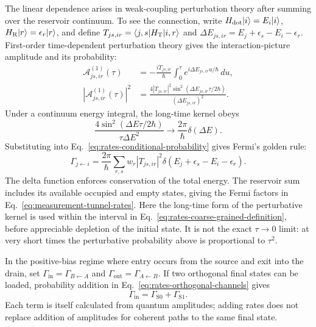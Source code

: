 The linear dependence arises in weak-coupling perturbation theory
after summing over the reservoir continuum. To see the connection,
write $H_{\mathrm{dot}}\lvert i\rangle=E_i\lvert i\rangle$,
$H_{\mathrm R}\lvert r\rangle=\epsilon_r\lvert r\rangle$, and define
$T_{js,ir}=\langle j,s\rvert H_{\mathrm T}\lvert i,r\rangle$ and
$\Delta E_{js,ir}=E_j+\epsilon_s-E_i-\epsilon_r$.
First-order time-dependent perturbation theory gives the
interaction-picture amplitude and its probability:
\begin{equation}
 \begin{aligned}
 \mathcal A^{(1)}_{js,ir}(\tau)
   &=-\frac{iT_{js,ir}}{\hbar}
       \int_0^\tau e^{i\Delta E_{js,ir}u/\hbar}\,du,\\
 |\mathcal A^{(1)}_{js,ir}(\tau)|^2
   &=\frac{4|T_{js,ir}|^2
       \sin^2(\Delta E_{js,ir}\tau/2\hbar)}{(\Delta E_{js,ir})^2}.
 \end{aligned}
 \label{eq:rates-perturbative-amplitude}
\end{equation}
Under a continuum energy integral, the long-time kernel obeys
\[
 \frac{4\sin^2(\Delta E\tau/2\hbar)}{\tau\Delta E^2}
     \longrightarrow\frac{2\pi}{\hbar}\delta(\Delta E).
\]
Substituting into
Eq.~\eqref{eq:rates-conditional-probability} gives Fermi's golden rule:
\begin{equation}
 \Gamma_{j\leftarrow i}
 =\frac{2\pi}{\hbar}\sum_{r,s}w_r|T_{js,ir}|^2
       \delta(E_j+\epsilon_s-E_i-\epsilon_r).
 \label{eq:rates-golden-rule}
\end{equation}
The delta function enforces conservation of the total energy.
The reservoir sum includes its available occupied and empty
states, giving the Fermi factors in
Eq.~\eqref{eq:measurement-tunnel-rates}.
Here the long-time form of the perturbative kernel is used within
the interval in Eq.~\eqref{eq:rates-coarse-grained-definition},
before appreciable depletion of the initial state. It is not
the exact $\tau\to0$ limit: at very short times the perturbative
probability above is proportional to $\tau^2$.

In the positive-bias regime where entry occurs from the source
and exit into the drain, set
$\Gamma_{\mathrm{in}}=\Gamma_{B\leftarrow A}$ and
$\Gamma_{\mathrm{out}}=\Gamma_{A\leftarrow B}$.
If two orthogonal final states can be loaded, probability addition
in Eq.~\eqref{eq:rates-orthogonal-channels} gives
\begin{equation}
 \Gamma_{\mathrm{in}}
   =\Gamma_{\mathrm S0}+\Gamma_{\mathrm S1}.
 \label{eq:rates-additive-entry}
\end{equation}
Each term is itself calculated from quantum amplitudes; adding
rates does not replace addition of amplitudes for coherent paths
to the same final state.

